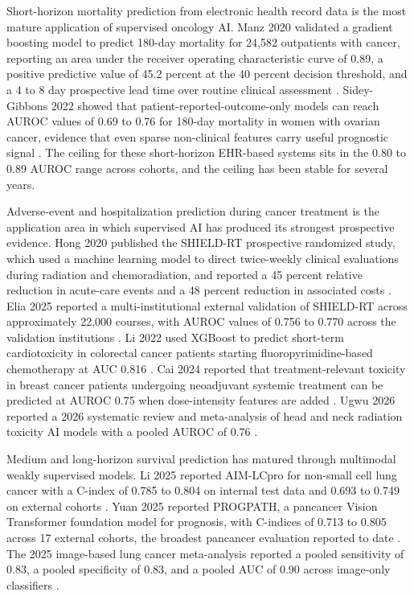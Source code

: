 Short-horizon mortality prediction from electronic health record data
is the most mature application of supervised oncology AI. Manz 2020
validated a gradient boosting model to predict 180-day mortality for
24,582 outpatients with cancer, reporting an area under the receiver
operating characteristic curve of 0.89, a positive predictive value of
45.2 percent at the 40 percent decision threshold, and a 4 to 8 day
prospective lead time over routine clinical assessment
\cite{Manz2020Oncology180DayMortality}. Sidey-Gibbons 2022 showed that
patient-reported-outcome-only models can reach AUROC values of 0.69 to
0.76 for 180-day mortality in women with ovarian cancer, evidence that
even sparse non-clinical features carry useful prognostic signal
\cite{SideyGibbons2022OvarianPROMortality}. The ceiling for these
short-horizon EHR-based systems sits in the 0.80 to 0.89 AUROC range
across cohorts, and the ceiling has been stable for several years.

Adverse-event and hospitalization prediction during cancer treatment
is the application area in which supervised AI has produced its
strongest prospective evidence. Hong 2020 published the SHIELD-RT
prospective randomized study, which used a machine learning model to
direct twice-weekly clinical evaluations during radiation and
chemoradiation, and reported a 45 percent relative reduction in
acute-care events and a 48 percent reduction in associated costs
\cite{Hong2020SHIELDRT}. Elia 2025 reported a multi-institutional
external validation of SHIELD-RT across approximately 22,000 courses,
with AUROC values of 0.756 to 0.770 across the validation institutions
\cite{Elia2025SHIELDRTExternalValidation}. Li 2022 used XGBoost to
predict short-term cardiotoxicity in colorectal cancer patients
starting fluoropyrimidine-based chemotherapy at AUC 0.816
\cite{Li2022FluoropyrimidineCardiotoxicity}. Cai 2024 reported that
treatment-relevant toxicity in breast cancer patients undergoing
neoadjuvant systemic treatment can be predicted at AUROC 0.75 when
dose-intensity features are added \cite{Cai2024BreastCancerToxicityPrediction}.
Ugwu 2026 reported a 2026 systematic review and meta-analysis of head
and neck radiation toxicity AI models with a pooled AUROC of 0.76
\cite{Ugwu2026HeadNeckRadiationToxicityMeta}.

Medium and long-horizon survival prediction has matured through
multimodal weakly supervised models. Li 2025 reported AIM-LCpro for
non-small cell lung cancer with a C-index of 0.785 to 0.804 on internal
test data and 0.693 to 0.749 on external cohorts
\cite{Li2025AIMLCpro}. Yuan 2025 reported PROGPATH, a pancancer Vision
Transformer foundation model for prognosis, with C-indices of 0.713 to
0.805 across 17 external cohorts, the broadest pancancer evaluation
reported to date \cite{Yuan2025PROGPATH}. The 2025 image-based lung
cancer meta-analysis reported a pooled sensitivity of 0.83, a pooled
specificity of 0.83, and a pooled AUC of 0.90 across image-only
classifiers \cite{Yuan2025LungImageMeta}.


